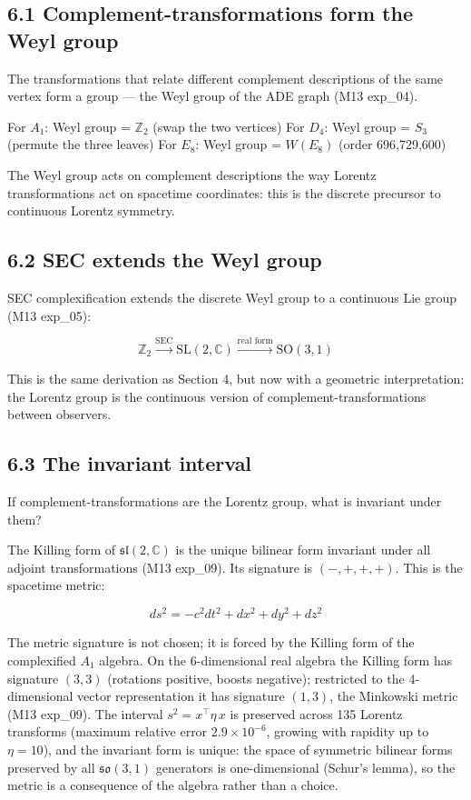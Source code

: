 \documentclass[11pt,a4paper]{article}
\begin{document}
\subsection*{6.1 Complement-transformations form the Weyl group}

The transformations that relate different complement descriptions of the same vertex form a group — the Weyl group of the ADE graph (M13 exp\_04).

For $A_1$: Weyl group = $\mathbb{Z}_2$ (swap the two vertices) For $D_4$: Weyl group = $S_3$ (permute the three leaves) For $E_8$: Weyl group = $W(E_8)$ (order 696,729,600)

The Weyl group acts on complement descriptions the way Lorentz transformations act on spacetime coordinates: this is the discrete precursor to continuous Lorentz symmetry.

\subsection*{6.2 SEC extends the Weyl group}

SEC complexification extends the discrete Weyl group to a continuous Lie group (M13 exp\_05):

\[\mathbb{Z}_2 \xrightarrow{\text{SEC}} \text{SL}(2, \mathbb{C}) \xrightarrow{\text{real form}} \text{SO}(3,1)\]

This is the same derivation as Section 4, but now with a geometric interpretation: the Lorentz group is the continuous version of complement-transformations between observers.

\subsection*{6.3 The invariant interval}

If complement-transformations are the Lorentz group, what is invariant under them?

The Killing form of $\mathfrak{sl}(2, \mathbb{C})$ is the unique bilinear form invariant under all adjoint transformations (M13 exp\_09). Its signature is $(-,+,+,+)$. This is the spacetime metric:

\[ds^2 = -c^2 dt^2 + dx^2 + dy^2 + dz^2\]

The metric signature is not chosen; it is forced by the Killing form of the complexified $A_1$ algebra. On the 6-dimensional real algebra the Killing form has signature $(3,3)$ (rotations positive, boosts negative); restricted to the 4-dimensional vector representation it has signature $(1,3)$, the Minkowski metric (M13 exp\_09). The interval $s^2 = x^\top\eta\,x$ is preserved across 135 Lorentz transforms (maximum relative error $2.9\times10^{-6}$, growing with rapidity up to $\eta=10$), and the invariant form is unique: the space of symmetric bilinear forms preserved by all $\mathfrak{so}(3,1)$ generators is one-dimensional (Schur's lemma), so the metric is a consequence of the algebra rather than a choice.
\end{document}
